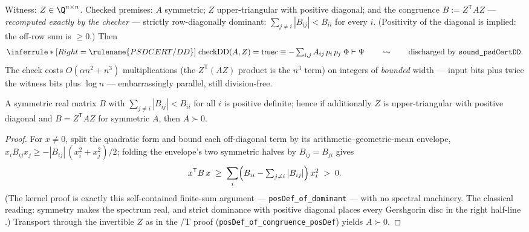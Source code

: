 

\begin{brecipe}\label{rec:psddd-instance}
Witness: $Z \in \Q^{n\times n}$. Checked premises: $A$ symmetric; $Z$
upper-triangular with positive diagonal; and the congruence
$B := Z^{\mathsf T} A Z$ --- \emph{recomputed exactly by the checker} ---
strictly row-diagonally dominant:
$\sum_{j \neq i} |B_{ij}| < B_{ii}$ for every $i$. (Positivity of the
diagonal is implied: the off-row sum is $\geq 0$.) Then
\[
\inferrule*[Right=\rulename{PSDCERT/DD}]
  {\;\mathrm{checkDD}(A, Z) = \mathsf{true} \\
    c \equiv -\textstyle\sum_{i,j} A_{ij}\,p_i\,p_j\;}
  {\Phi \vdash \Psi}
\qquad\rightsquigarrow\qquad
\text{\upshape discharged by } \texttt{sound\_psdCertDD}.
\]
The check costs $O(\alpha n^2 + n^3)$ multiplications (the
$Z^{\mathsf T}(AZ)$ product is the $n^3$ term) on integers of
\emph{bounded} width --- input bits plus twice the witness bits plus
$\log n$ --- embarrassingly parallel, still division-free.
\end{brecipe}

\begin{bprop}\label{prop:psddd-matrix}
A symmetric real matrix $B$ with
$\sum_{j\neq i}|B_{ij}| < B_{ii}$ for all $i$ is positive definite;
hence if additionally $Z$ is upper-triangular with positive diagonal
and $B = Z^{\mathsf T} A Z$ for symmetric $A$, then $A \succ 0$.
\end{bprop}
\begin{proof}
For $x \neq 0$, split the quadratic form and bound each off-diagonal
term by its arithmetic--geometric-mean envelope,
$x_i B_{ij} x_j \geq -|B_{ij}|\,(x_i^2 + x_j^2)/2$; folding the
envelope's two symmetric halves by $B_{ij} = B_{ji}$ gives
\[
x^{\mathsf T} B\, x \;\geq\; \sum_i \Bigl(B_{ii} -
\textstyle\sum_{j \neq i} |B_{ij}|\Bigr)\, x_i^2 \;>\; 0 .
\]
(The kernel proof is exactly this self-contained finite-sum argument
--- \texttt{posDef\_of\_dominant} --- with no spectral machinery. The
classical reading: symmetry makes the spectrum real, and strict
dominance with positive diagonal places every Gershgorin disc in the
right half-line \cite{gershgorin1931,taussky1949,hornjohnson2013}.)
Transport through the invertible $Z$ as in the /T proof
(\texttt{posDef\_of\_congruence\_posDef}) yields $A \succ 0$.
\end{proof}

